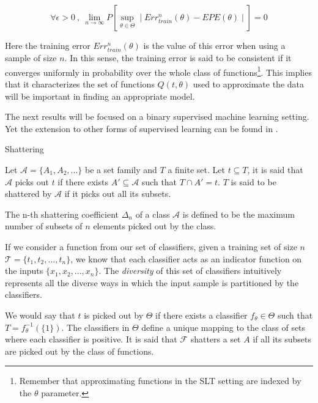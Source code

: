 \begin{equation}
\forall \epsilon > 0 \ , \ \lim_{n\to\infty} P\left[ \sup_{\theta \in \Theta} \mid Err^{n}_{train}(\theta)  - EPE(\theta) \mid \right]  = 0 
\end{equation}

Here the training error $Err^{n}_{train}(\theta)$ is the value of this error when using a sample of size $n$. In this sense, the training error is said to be consistent if it converges uniformly in probability over the whole class of functions\footnote{Remember that approximating functions in the SLT setting are indexed by the $\theta$ parameter.}. This implies that it characterizes the set of functions $Q(t,\theta)$ used to approximate the data will be important in finding an appropriate model. %

The next results will be focused on a binary supervised machine learning setting. Yet the extension to other forms of supervised learning can be found in \textcite{cherkassky-learning2007}.

\begin{definition}{Shattering}

Let $\mathcal {A}= \{A_1,A_{2},\dots \}$ be a set family and $T$ a finite set. Let $t \subseteq T$, it is said that $\mathcal {A}$ picks out $t$ if there exists $A' \subseteq \mathcal {A} $ such that $ T \cap A' = t$. $T$ is said to be shattered by $\mathcal {A}$ if it picks out all its subsets.


\end{definition}

The n-th shattering coefficient $\Delta_n$ of a class $\mathcal {A}$ is defined to be the maximum number of subsets of $n$ elements picked out by the class.

If we consider a function from our set of classifiers, given a training set of size $n$
$\mathcal {T} = \{ t_1,t_2,...,t_n  \}$, we know that each classifier acts as an indicator function on the inputs $\{ x_1,x_2,...,x_n  \}$. The \textit{diversity} of this set of classifiers intuitively represents all the diverse ways in which the input sample is partitioned by the classifiers.

We would say that $t$ is picked out by $\Theta$ if there exists a classifier $f_{\theta} \in \Theta$ such that $T = f_{\theta}^{-1}(\{1\})$. The classifiers in $\Theta$ define a unique mapping to the class of sets where each classifier is positive. It is said that $\mathcal {F}$ shatters a set $A$ if all its subsets are picked out by the class of functions.

